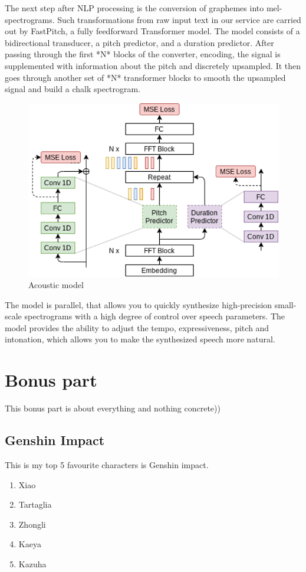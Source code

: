 \documentclass[10pt,a4paper]{report}
\begin{document}
The next step after NLP processing is the conversion of graphemes into mel-spectrograms. Such transformations from raw input text in our service are carried out by FastPitch, a fully feedforward Transformer model. The model consists of a bidirectional transducer, a pitch predictor, and a duration predictor. After passing through the first *N* blocks of the converter, encoding, the signal is supplemented with information about the pitch and discretely upsampled. It then goes through another set of *N* transformer blocks to smooth the upsampled signal and build a chalk spectrogram.
\newpage

\begin{figure}
\centering
\includegraphics[width=1\linewidth]{fourth.png}
\caption{Acoustic model}
\end{figure}
\noindent The model is parallel, that allows you to quickly synthesize high-precision small-scale spectrograms with a high degree of control over speech parameters. The model provides the ability to adjust the tempo, expressiveness, pitch and intonation, which allows you to make the synthesized speech more natural.

\chapter{Bonus part}
This bonus part is about everything and nothing concrete))
\section{Genshin Impact}

This is my top 5 favourite characters is Genshin impact.
\begin{enumerate}  
	\item Xiao 
	\item Tartaglia 
	\item Zhongli
	\item Kaeya
	\item Kazuha
\end{enumerate}
\end{document}
